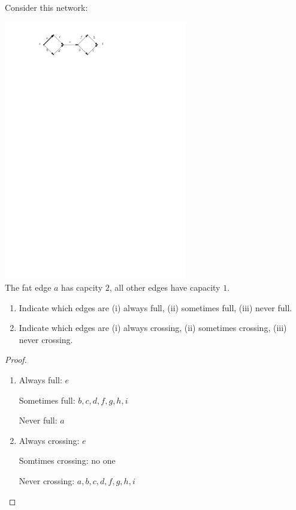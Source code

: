 \documentclass[12pt,a4]{article}
\begin{document}
\begin{exercise}
Consider this network: 
\begin{center}
\includegraphics[width=0.6\textwidth]{figures/other-flow-network-always-sometimes-never.pdf}\\
\small The fat edge $a$ has capcity $2$, all other edges have capacity $1$.
\end{center}
\begin{enumerate}
\item Indicate which edges are (i) always full, (ii) sometimes full, (iii) never full.
\item Indicate which edges are (i) always crossing, (ii) sometimes crossing, (iii) never crossing.
\end{enumerate}
\end{exercise}

\begin{proof}
  \begin{enumerate}
    \item
    Always full: $e$\par
    Sometimes full: $b,c,d,f,g,h,i$\par
    Never full: $a$\par

    \item
    Always crossing: $e$\par
    Somtimes crossing: no one\par
    Never crossing: $a,b,c,d,f,g,h,i$\par

  \end{enumerate}
\end{proof}
\end{document}
